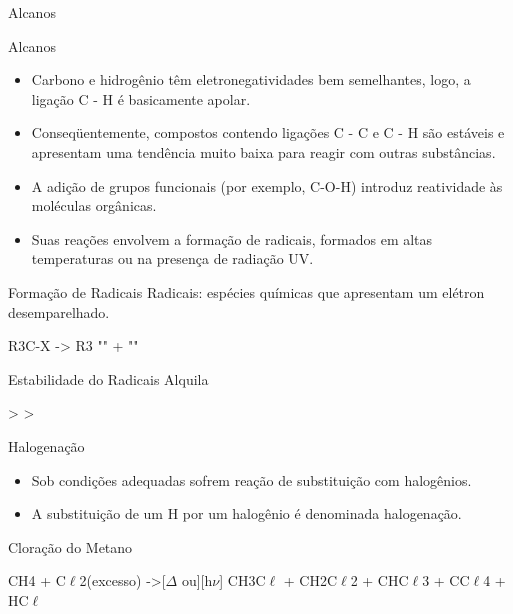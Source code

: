 \documentclass{beamer}
\begin{document}
\begin{frame}[label={sec:orga0e5a76}]{Alcanos}
\begin{block}{Alcanos}
\begin{itemize}
\item Carbono e hidrogênio têm eletronegatividades bem semelhantes, logo, a ligação C - H é basicamente apolar.
\item Conseqüentemente, compostos contendo ligações C - C e C - H são estáveis e apresentam uma tendência muito baixa para reagir com outras substâncias.
\item A adição de grupos funcionais (por exemplo, C-O-H) introduz reatividade às moléculas orgânicas.
\item Suas reações envolvem a formação de radicais, formados em altas temperaturas ou na presença de radiação UV.
\end{itemize}
\end{block}

\begin{block}{Formação de Radicais}
\alert{Radicais:} espécies químicas que apresentam um elétron desemparelhado.

\begin{reaction}
	R3C-X -> R3 ""  +  ""
\end{reaction}


\begin{bclogo}[couleur=blue!30 , arrondi=0.1 , logo=\bcplume , epBarre=3.5]{Estabilidade do Radicais Alquila}
\begin{center}	
 \qquad > \qquad {} \qquad > \qquad {}
\end{center}
\end{bclogo}
\end{block}

\begin{block}{Halogenação}
\begin{itemize}
\item Sob condições adequadas sofrem reação de substituição com halogênios.
\item A substituição de um \alert{H} por um halogênio é denominada \alert{halogenação}.
\end{itemize}



\begin{bclogo}[couleur=blue!30 , arrondi=0.1 , logo=\bcplume , epBarre=3.5]{Cloração do Metano}
\begin{reaction*}
CH4 + C$\ell$2(excesso) ->[$\Delta$ ou][h$\nu$] CH3C$\ell$ + CH2C$\ell$2 + CHC$\ell$3 + CC$\ell$4 + HC$\ell$
\end{reaction*}	 
\end{bclogo}
\end{block}



\end{frame}
\end{document}
